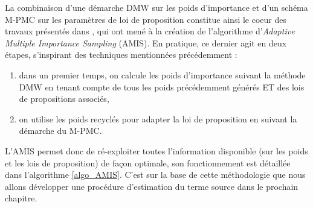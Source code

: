 La combinaison d'une démarche DMW sur les poids d'importance et d'un schéma M-PMC sur les paramètres de loi de proposition constitue ainsi le coeur des travaux présentés dans \cite{Cornuet2012}, qui ont mené à la création de l'algorithme d'\textit{Adaptive Multiple Importance Sampling} (AMIS). En pratique, ce dernier agit en deux étapes, s'inspirant des techniques mentionnées précédemment : 
\begin{enumerate}
	\item dans un premier temps, on calcule les poids d'importance suivant la méthode DMW en tenant compte de tous les poids précédemment générés ET des lois de propositions associés,
	\item on utilise les poids recyclés pour adapter la loi de proposition en suivant la démarche du M-PMC.
\end{enumerate}

L'AMIS permet donc de ré-exploiter toutes l'information disponible (sur les poids et les lois de proposition) de façon optimale, son fonctionnement est détaillée dans l'algorithme \ref{algo_AMIS}. C'est sur la base de cette méthodologie que nous allons développer une procédure d'estimation du terme source dans le prochain chapitre. \\


